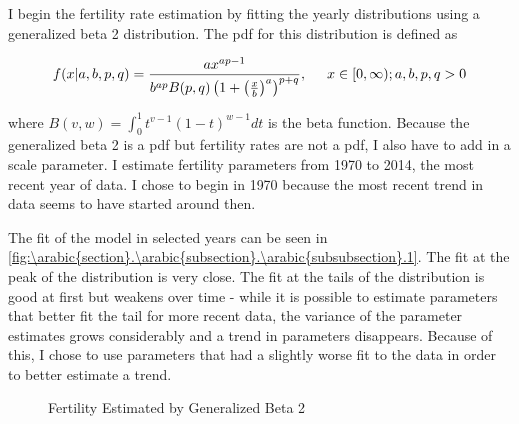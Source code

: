 \documentclass[10pt]{article}
\renewcommand{\thesection}{\arabic{section}}
\renewcommand{\thesubsection}{\thesection.\arabic{subsection}}
\renewcommand{\thesubsubsection}{\thesubsection.\arabic{subsubsection}}
\renewcommand{\subsubsection}[2][]{\oldsubsubsection[#1]{#2}\index{#1}\label{sec:\thesubsubsection}}
\numberwithin{equation}{subsection}
\newcommand*{\FigureDir}{../../graphs}
\begin{document}
\subsubsection{Fertility Rates}

\par I begin the fertility rate estimation by fitting the yearly distributions using a generalized beta 2 distribution. The pdf for this distribution is defined as

\begin{equation}\label{eq:gb2_pdf}
   f(x|a, b, p, q) = \frac{ax^{ap-1}}{b^{ap}B(p,q)\left(1 + \left(\frac{x}{b}\right)^a\right)^{p+q}}, \hspace{5mm} x \in [0,\infty); a, b, p, q > 0   
\end{equation}

\par where \(B(v,w) = \int_0^1 t^{v-1}(1-t)^{w-1}dt\) is the beta function. Because the generalized beta 2 is a pdf but fertility rates are not a pdf, I also have to add in a scale parameter. I estimate fertility parameters from 1970 to 2014, the most recent year of data. I chose to begin in 1970 because the most recent trend in data seems to have started around then.

\par The fit of the model in selected years can be seen in \autoref{fig:\thesubsubsection.1}. The fit at the peak of the distribution is very close. The fit at the tails of the distribution is good at first but weakens over time - while it is possible to estimate parameters that better fit the tail for more recent data, the variance of the parameter estimates grows considerably and a trend in parameters disappears. Because of this, I chose to use parameters that had a slightly worse fit to the data in order to better estimate a trend.

\begin{figure}[!ht]
   \centering
   \caption{\label{fig:\thesubsubsection.1}Fertility Estimated by Generalized Beta 2}
\end{figure}
\end{document}
